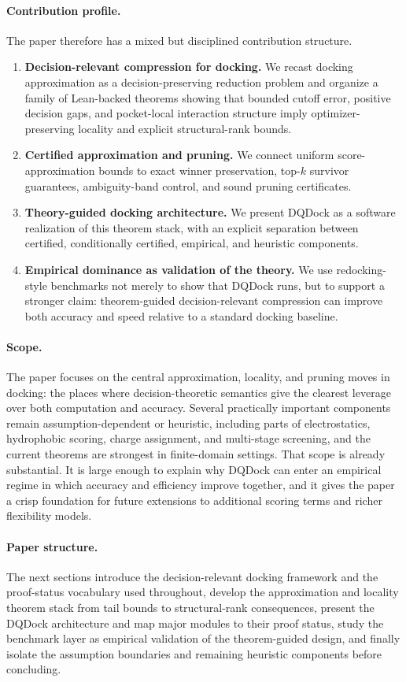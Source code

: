 \paragraph{Contribution profile.}
The paper therefore has a mixed but disciplined contribution structure.
\begin{enumerate}
\item \textbf{Decision-relevant compression for docking.} We recast docking approximation as a decision-preserving reduction problem and organize a family of Lean-backed theorems showing that bounded cutoff error, positive decision gaps, and pocket-local interaction structure imply optimizer-preserving locality and explicit structural-rank bounds.
\item \textbf{Certified approximation and pruning.} We connect uniform score-approximation bounds to exact winner preservation, top-$k$ survivor guarantees, ambiguity-band control, and sound pruning certificates.
\item \textbf{Theory-guided docking architecture.} We present DQDock as a software realization of this theorem stack, with an explicit separation between certified, conditionally certified, empirical, and heuristic components.
\item \textbf{Empirical dominance as validation of the theory.} We use redocking-style benchmarks not merely to show that DQDock runs, but to support a stronger claim: theorem-guided decision-relevant compression can improve both accuracy and speed relative to a standard docking baseline.
\end{enumerate}

\paragraph{Scope.}
The paper focuses on the central approximation, locality, and pruning moves in docking: the places where decision-theoretic semantics give the clearest leverage over both computation and accuracy. Several practically important components remain assumption-dependent or heuristic, including parts of electrostatics, hydrophobic scoring, charge assignment, and multi-stage screening, and the current theorems are strongest in finite-domain settings. That scope is already substantial. It is large enough to explain why DQDock can enter an empirical regime in which accuracy and efficiency improve together, and it gives the paper a crisp foundation for future extensions to additional scoring terms and richer flexibility models.

\paragraph{Paper structure.}
The next sections introduce the decision-relevant docking framework and the proof-status vocabulary used throughout, develop the approximation and locality theorem stack from tail bounds to structural-rank consequences, present the DQDock architecture and map major modules to their proof status, study the benchmark layer as empirical validation of the theorem-guided design, and finally isolate the assumption boundaries and remaining heuristic components before concluding.

